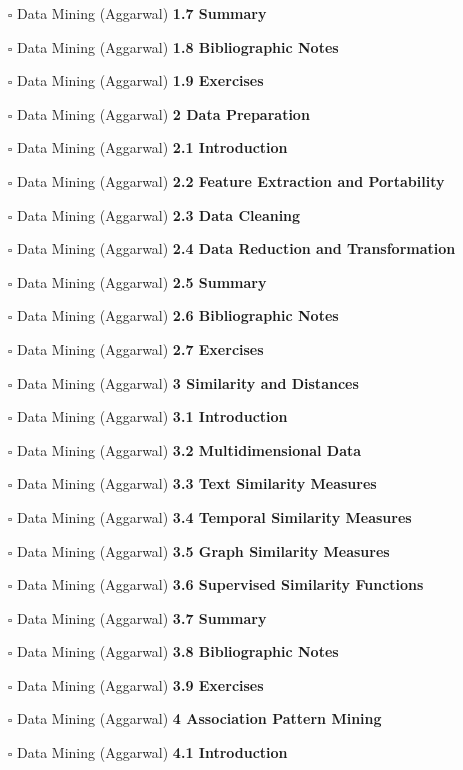\documentclass[a4, landscape, 12pt]{article}
\newcommand{\checkbox}{$\square$}%
\begin{document}
\begin{itemize}
{}
\item [\checkbox]  Data Mining (Aggarwal) \textbf{ 1.7 Summary
}
\item [\checkbox]  Data Mining (Aggarwal) \textbf{ 1.8 Bibliographic Notes
}
\item [\checkbox]  Data Mining (Aggarwal) \textbf{ 1.9 Exercises
}
\item [\checkbox]  Data Mining (Aggarwal) \textbf{ 2 Data Preparation
}
\item [\checkbox]  Data Mining (Aggarwal) \textbf{ 2.1 Introduction
}
\item [\checkbox]  Data Mining (Aggarwal) \textbf{ 2.2 Feature Extraction and Portability
}
\item [\checkbox]  Data Mining (Aggarwal) \textbf{ 2.3 Data Cleaning
}
\item [\checkbox]  Data Mining (Aggarwal) \textbf{ 2.4 Data Reduction and Transformation
}
\item [\checkbox]  Data Mining (Aggarwal) \textbf{ 2.5 Summary
}
\item [\checkbox]  Data Mining (Aggarwal) \textbf{ 2.6 Bibliographic Notes
}
\item [\checkbox]  Data Mining (Aggarwal) \textbf{ 2.7 Exercises
}
\item [\checkbox]  Data Mining (Aggarwal) \textbf{ 3 Similarity and Distances
}
\item [\checkbox]  Data Mining (Aggarwal) \textbf{ 3.1 Introduction
}
\item [\checkbox]  Data Mining (Aggarwal) \textbf{ 3.2 Multidimensional Data
}
\item [\checkbox]  Data Mining (Aggarwal) \textbf{ 3.3 Text Similarity Measures
}
\item [\checkbox]  Data Mining (Aggarwal) \textbf{ 3.4 Temporal Similarity Measures
}
\item [\checkbox]  Data Mining (Aggarwal) \textbf{ 3.5 Graph Similarity Measures
}
\item [\checkbox]  Data Mining (Aggarwal) \textbf{ 3.6 Supervised Similarity Functions
}
\item [\checkbox]  Data Mining (Aggarwal) \textbf{ 3.7 Summary
}
\item [\checkbox]  Data Mining (Aggarwal) \textbf{ 3.8 Bibliographic Notes
}
\item [\checkbox]  Data Mining (Aggarwal) \textbf{ 3.9 Exercises
}
\item [\checkbox]  Data Mining (Aggarwal) \textbf{ 4 Association Pattern Mining
}
\item [\checkbox]  Data Mining (Aggarwal) \textbf{ 4.1 Introduction
}
\end{itemize}
\end{document}
